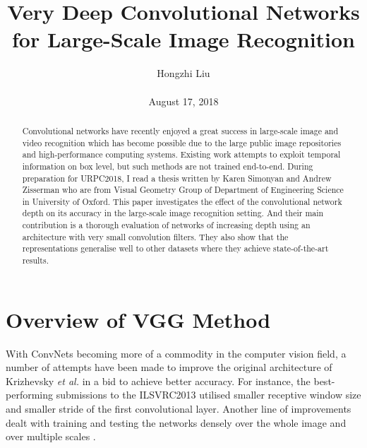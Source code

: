 \documentclass[10pt,twocolumn,letterpaper]{article}
\title{Very Deep Convolutional Networks for Large-Scale Image Recognition}
\author{Hongzhi Liu\\\\
August 17, 2018}
\begin{document}
\maketitle
\begin{abstract}
	Convolutional networks have recently enjoyed a great success in large-scale image and video recognition which has become possible due to the large public image repositories and high-performance computing systems. Existing work attempts to exploit temporal information on box level, but such methods are not trained end-to-end. During preparation for URPC2018, I read a thesis written by Karen Simonyan and Andrew Zisserman who are from Visual Geometry Group of Department of Engineering Science in University of Oxford. This paper investigates the effect of the convolutional network depth on its accuracy in the large-scale image recognition setting. And their main contribution is a thorough evaluation of networks of increasing depth using an architecture with very small convolution filters. They also show that the representations generalise well to other datasets where they achieve state-of-the-art results.
\end{abstract}

\section{Overview of VGG Method}

With ConvNets becoming more of a commodity in the computer vision field, a number of attempts have been made to improve the original architecture of Krizhevsky \emph{et al.} \cite{Krizhevsky2012ImageNet} in a bid to achieve better accuracy. For instance, the best-performing submissions to the ILSVRC2013 \cite{Zeiler2014Visualizing,Sermanet2013OverFeat} utilised smaller receptive window size and smaller stride of the first convolutional layer. Another line of improvements dealt with training and testing the networks densely over the whole image and over multiple scales \cite{Sermanet2013OverFeat,Howard2013Some}. 
\end{document}
